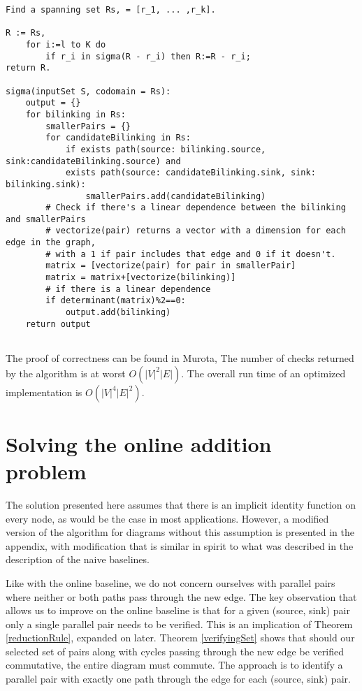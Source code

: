\documentclass[runningheads]{llncs}
\begin{document}
\begin{verbatim}
Find a spanning set Rs, = [r_1, ... ,r_k].

R := Rs,
    for i:=l to K do
        if r_i in sigma(R - r_i) then R:=R - r_i;
return R.

sigma(inputSet S, codomain = Rs):
    output = {}
    for bilinking in Rs:
        smallerPairs = {}
        for candidateBilinking in Rs:
            if exists path(source: bilinking.source, sink:candidateBilinking.source) and
            exists path(source: candidateBilinking.sink, sink: bilinking.sink):
                smallerPairs.add(candidateBilinking)
        # Check if there's a linear dependence between the bilinking and smallerPairs
        # vectorize(pair) returns a vector with a dimension for each edge in the graph,
        # with a 1 if pair includes that edge and 0 if it doesn't.
        matrix = [vectorize(pair) for pair in smallerPair]
        matrix = matrix+[vectorize(bilinking)]
        # if there is a linear dependence
        if determinant(matrix)%2==0:
            output.add(bilinking)
    return output
                
\end{verbatim}

The proof of correctness can be found in Murota\cite{commutative}, 
The number of checks returned by the algorithm is at worst $O(|V|^2|E|)$. The overall run time of an optimized implementation is $O(|V|^4|E|^2)$.

\section{Solving the online addition problem}

The solution presented here assumes that there is an implicit identity function on every node, as would be the case in most applications. However, a modified version of the algorithm for diagrams without this assumption is presented in the appendix, with modification that is similar in spirit to what was described in the description of the naive baselines.

Like with the online baseline, we do not concern ourselves with parallel pairs where neither or both paths pass through the new edge.
The key observation that allows us to improve on the online baseline is that for a given (source, sink) pair only a single parallel pair needs to be verified. This is an implication of Theorem \ref{reductionRule}, expanded on later.
Theorem \ref{verifyingSet} shows that should our selected set of pairs along with cycles passing through the new edge be verified commutative, the entire diagram must commute. The approach is to identify a parallel pair with exactly one path through the edge for each (source, sink) pair.
\end{document}
